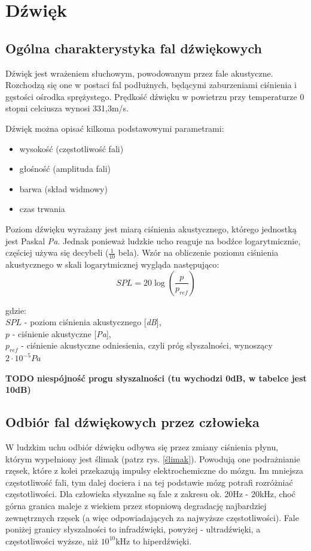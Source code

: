 \chapter{Dźwięk}
\label{cha:dwiek}

\section{Ogólna charakterystyka fal dźwiękowych}
Dźwięk jest wrażeniem słuchowym, powodowanym przez fale akustyczne. Rozchodzą się one w postaci fal podłużnych, będącymi zaburzeniami ciśnienia i gęstości ośrodka sprężystego\cite{FaleAkustyczne}. Prędkość dźwięku w powietrzu przy temperaturze 0 stopni celciusza wynosi 331,3m/s.

Dźwięk można opisać kilkoma podstawowymi parametrami:

\begin{itemize}
	\item wysokość (częstotliwość fali)
	\item głośność (amplituda fali)
	\item barwa (skład widmowy)
	\item czas trwania
\end{itemize}

Poziom dźwięku wyrażany jest miarą ciśnienia akustycznego, którego jednostką jest Paskal \textit{Pa}. Jednak ponieważ ludzkie ucho reaguje na bodźce logarytmicznie, częściej używa się decybeli ($\frac{1}{10}$ bela). Wzór na obliczenie poziomu ciśnienia akustycznego w skali logarytmicznej wygląda następująco\cite{CisnienieAkustyczne}:
\begin{equation}
SPL = 20\log{(\frac{p}{p_{ref}})}
\end{equation}

gdzie: \\
\indent$SPL$ - poziom ciśnienia akustycznego [\textit{dB}], \\
\indent$p$ - ciśnienie akustyczne [\textit{Pa}], \\
\indent$p_{ref}$ - ciśnienie akustyczne odniesienia, czyli próg słyszalności, wynoszący $2\cdot10^{-5} Pa$ 

\textbf{TODO niespójność progu słyszalności (tu wychodzi 0dB, w tabelce jest 10dB)}


\section{Odbiór fal dźwiękowych przez człowieka}
W ludzkim uchu odbiór dźwięku odbywa się przez zmiany ciśnienia płynu, którym wypełniony jest ślimak (patrz rys. \ref{ślimak}). Powodują one podrażnianie rzęsek, które z kolei przekazują impulsy elektrochemiczne do mózgu. Im mniejsza częstotliwość fali, tym dalej dociera i na tej podstawie mózg potrafi rozróżniać częstotliwości. Dla człowieka słyszalne są fale z zakresu ok. 20Hz - 20kHz, choć górna granica maleje z wiekiem przez stopniową degradację najbardziej zewnętrznych rzęsek (a więc odpowiadających za najwyższe częstotliwości).\cite{JakSlyszymy} 
Fale poniżej granicy słyszalności to infradźwięki, powyżej - ultradźwięki, a częstotliwości wyższe, niż $\text{10}^{\text{10}}$kHz to hiperdźwięki.

